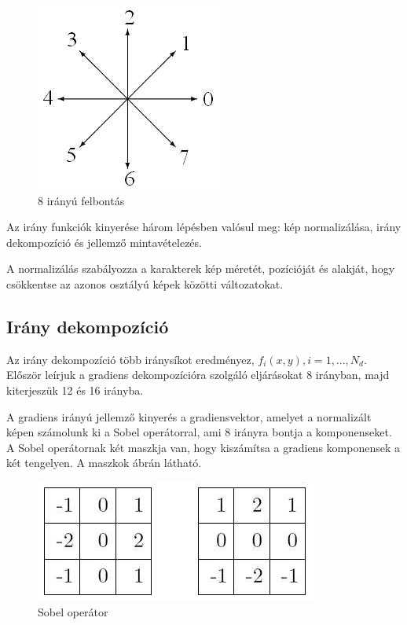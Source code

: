 \begin{figure}[h]
\centering
\includegraphics[scale=0.5]{images/direction8}
\caption{8 irányú felbontás}
\label{fig:direction8}
\end{figure}

Az irány funkciók kinyerése\cite{liu2008handwritten} három lépésben valósul meg: kép normalizálása, irány dekompozíció és jellemző mintavételezés. 

A normalizálás szabályozza a karakterek kép méretét, pozícióját és alakját, hogy csökkentse az azonos osztályú képek közötti változatokat.

\subsection{Irány dekompozíció}

Az irány dekompozíció több iránysíkot eredményez, $f_i(x, y), i = 1,. . . , N_d$. Először leírjuk a gradiens dekompozícióra szolgáló eljárásokat 8 irányban, majd kiterjeszük 12 és 16 irányba.

A gradiens irányú jellemző kinyerés a gradiensvektor, amelyet a normalizált képen számolunk ki a Sobel operátorral, ami 8 irányra bontja a komponenseket. A Sobel operátornak két maszkja van, hogy kiszámítsa a gradiens komponensek a két tengelyen. A maszkok  ábrán látható.

\begin{figure}[h]
\centering
\includegraphics[scale=0.5]{images/sobel_operator}
\caption{Sobel operátor}
\label{fig:sobel_operator}
\end{figure}

